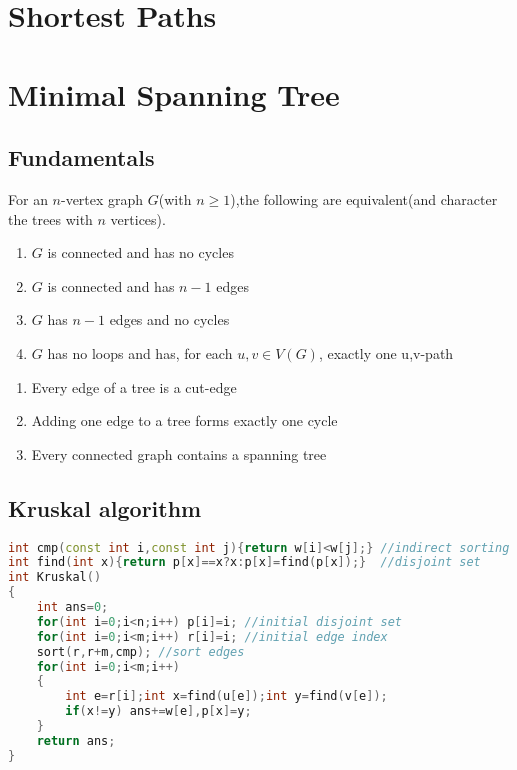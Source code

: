 \section{Shortest Paths}
 



 \section{Minimal Spanning Tree}
  \subsection{Fundamentals}
  \begin{thm}
For an $n$-vertex graph $G$(with $n \ge 1$),the following are equivalent(and character the trees with $n$ vertices).
   \begin{enumerate}
    \item $G$ is connected and has no cycles
    \item $G$ is connected and has $n-1$ edges
    \item $G$ has $n-1$ edges and no cycles
    \item $G$ has no loops and has, for each $u,v \in V(G)$, exactly one u,v-path
   \end{enumerate}
  \end{thm}

  \begin{cor}
   \begin{enumerate}
    \item Every edge of a tree is a cut-edge
    \item Adding one edge to a tree forms exactly one cycle
    \item Every connected graph contains a spanning tree
   \end{enumerate}
  \end{cor}
  \subsection{Kruskal algorithm}
  \begin{lstlisting}[language=C++]
int cmp(const int i,const int j){return w[i]<w[j];} //indirect sorting function
int find(int x){return p[x]==x?x:p[x]=find(p[x]);}  //disjoint set
int Kruskal()
{
	int ans=0;
	for(int i=0;i<n;i++) p[i]=i; //initial disjoint set
	for(int i=0;i<m;i++) r[i]=i; //initial edge index
	sort(r,r+m,cmp); //sort edges
	for(int i=0;i<m;i++)
	{
		int e=r[i];int x=find(u[e]);int y=find(v[e]);
		if(x!=y) ans+=w[e],p[x]=y;
	}
	return ans;
}
  \end{lstlisting}
